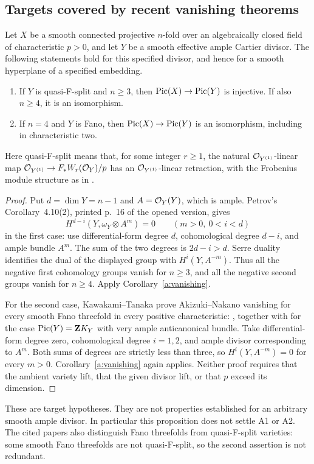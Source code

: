 \subsection{Targets covered by recent vanishing theorems}
\begin{proposition}
\label{a:known-targets}
Let $X$ be a smooth connected projective $n$-fold over an algebraically
closed field of characteristic $p>0$, and let $Y$ be a smooth effective
ample Cartier divisor. The following statements hold for this specified
divisor, and hence for a smooth hyperplane of a specified embedding.
\begin{enumerate}
\item If $Y$ is quasi-F-split and $n\geq3$, then
$\operatorname{Pic}(X)\to\operatorname{Pic}(Y)$ is injective. If also $n\geq4$, it is an isomorphism.
\item If $n=4$ and $Y$ is Fano, then
$\operatorname{Pic}(X)\to\operatorname{Pic}(Y)$ is an isomorphism, including in characteristic two.
\end{enumerate}
Here quasi-F-split means that, for some integer $r\geq1$, the natural
$\mathcal O_{Y^{(1)}}$-linear map
$\mathcal O_{Y^{(1)}}\to F_*W_r(\mathcal O_Y)/p$ has an
$\mathcal O_{Y^{(1)}}$-linear retraction, with the Frobenius module structure
as in \cite[\S1, p.~1]{RootPetrov2025}.
\end{proposition}
\begin{proof}
Put $d=\dim Y=n-1$ and $A=\mathcal O_Y(Y)$, which is ample.
Petrov's Corollary~4.10(2), printed p.~16 of the opened version,
gives
\[
 H^{d-i}(Y,\omega_Y\otimes A^m)=0
       \qquad (m>0,\ 0<i<d)
\]
in the first case: use differential-form degree $d$, cohomological
degree $d-i$, and ample bundle $A^m$. The sum of the two degrees is
$2d-i>d$. Serre duality identifies the dual of the displayed group
with $H^i(Y,A^{-m})$. Thus all the negative first cohomology groups
vanish for $n\geq3$, and all the negative second groups vanish for
$n\geq4$. Apply Corollary~\ref{a:vanishing}.

For the second case, Kawakami--Tanaka prove Akizuki--Nakano vanishing
for every smooth Fano threefold in every positive characteristic:
\cite[Theorem~7.2, p.~56]{RootKawakamiTanakaII2025}, together with
\cite[Theorem~6.3, p.~50]{RootKawakamiTanakaI2026} for the case
$\operatorname{Pic}(Y)=\mathbf ZK_Y$ with very ample anticanonical bundle.
Take differential-form degree zero, cohomological degree $i=1,2$,
and ample divisor corresponding to $A^m$. Both sums of degrees are
strictly less than three, so $H^i(Y,A^{-m})=0$ for every $m>0$.
Corollary~\ref{a:vanishing} again applies. Neither proof requires
that the ambient variety lift, that the given divisor lift, or that
$p$ exceed its dimension.
\end{proof}

These are target hypotheses. They are not properties established for
an arbitrary smooth ample divisor. In particular this proposition
does not settle A1 or A2. The cited papers also distinguish Fano
threefolds from quasi-F-split varieties: some smooth Fano threefolds
are not quasi-F-split, so the second assertion is not redundant.
